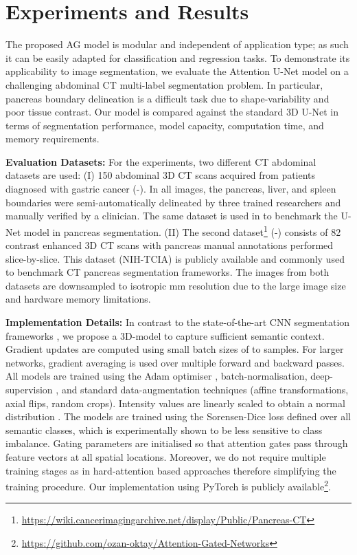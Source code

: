 \documentclass{article}
\begin{document}
\section{Experiments and Results}

The proposed AG model is modular and independent of application type; as such it can be easily adapted for classification and regression tasks. To demonstrate its applicability to image segmentation, we evaluate the Attention U-Net model on a challenging abdominal CT multi-label segmentation problem. In particular, pancreas boundary delineation is a difficult task due to shape-variability and poor tissue contrast. Our model is compared against the standard 3D U-Net in terms of segmentation performance, model capacity, computation time, and memory requirements. 

\textbf{Evaluation Datasets:} For the experiments, two different CT abdominal datasets are used: (I) 150 abdominal 3D CT scans acquired from patients diagnosed with gastric cancer (-). In all images, the pancreas, liver, and spleen boundaries were semi-automatically delineated by three trained researchers and manually verified by a clinician. The same dataset is used in \cite{roth2017hierarchical} to benchmark the U-Net model in pancreas segmentation. (II) The second dataset\footnote{\url{https://wiki.cancerimagingarchive.net/display/Public/Pancreas-CT}} (-) consists of 82 contrast enhanced 3D CT scans with pancreas manual annotations performed slice-by-slice. This dataset (NIH-TCIA) \cite{tciapancreas} is publicly available and commonly used to benchmark CT pancreas segmentation frameworks. The images from both datasets are downsampled to isotropic  mm resolution due to the large image size and hardware memory limitations. 

\textbf{Implementation Details:} In contrast to the state-of-the-art CNN segmentation frameworks \cite{cai2017improving, roth2018media}, we propose a 3D-model to capture sufficient semantic context. Gradient updates are computed using small batch sizes of  to  samples. For larger networks, gradient averaging is used over multiple forward and backward passes. All models are trained using the Adam optimiser \cite{kingma2014adam}, batch-normalisation, deep-supervision \cite{lee2015deeply}, and standard data-augmentation techniques (affine transformations, axial flips, random crops). Intensity values are linearly scaled to obtain a normal distribution . The models are trained using the Sorensen-Dice loss \cite{milletari2016v} defined over all semantic classes, which is experimentally shown to be less sensitive to class imbalance. Gating parameters are initialised so that attention gates pass through feature vectors at all spatial locations. Moreover, we do not require multiple training stages as in hard-attention based approaches therefore simplifying the training procedure. Our implementation using PyTorch is publicly available\footnote{\url{https://github.com/ozan-oktay/Attention-Gated-Networks}}.
\end{document}
